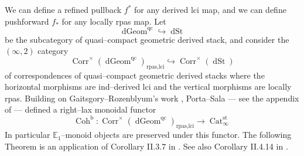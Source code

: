 \documentclass[11pt]{article}
\newcommand{\coh}{\operatorname{Coh}}
\begin{document}
    \noindent We can define a refined pullback $f^*$ for any derived lci map, and we can define pushforward $f_*$ for any locally rpas map. Let
    \[
      \operatorname{dGeom}^{\operatorname{qc}} \hookrightarrow \operatorname{dSt}  
    \]
    be the subcategory of quasi--compact geometric derived stack, and consider the $(\infty,2)$ category 
    \[
        \operatorname{Corr}^{\times}(\operatorname{dGeom}^{\operatorname{qc}})_{\operatorname{rpas,lci}} \hookrightarrow  \operatorname{Corr}^{\times}(\operatorname{dSt})
    \]
    of correspondences of quasi--compact geometric derived stacks where the horizontal morphisms are ind--derived lci and the vertical morphisms are locally rpas. Building on Gaitsgory--Rozenblyum's work \cite{gaitsgory2017study}, Porta--Sala --- see the appendix of \cite{Porta2019TwodimensionalCH} --- defined a right--lax monoidal functor
    \begin{equation}\label{eqn : coh for qc}\coh^{\operatorname{b}} \colon  \operatorname{Corr}^{\times}(\operatorname{dGeom}^{\operatorname{qc}})_{\operatorname{rpas,lci}} \longrightarrow \operatorname{Cat}^{\operatorname{st}}_{\infty}
    \end{equation}
    \noindent In particular $\mathbb{E}_1$--monoid objects are preserved under this functor. The following Theorem is an application of Corollary II.3.7 in \cite{dps}. See also Corollary II.4.14 in \cite{dps}.
\end{document}
